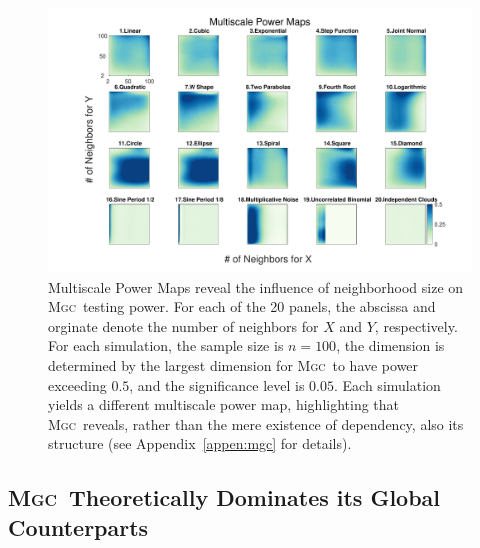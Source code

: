 \documentclass[11pt]{article}
\providecommand{\sct}[1]{{\normalfont\textsc{#1}}}
\newcommand{\Mgc}{\sct{Mgc}}
\begin{document}
\begin{figure}[htbp]
\includegraphics[width=1.0\textwidth]{../Figures/FigHDHeat}
\caption{Multiscale Power Maps reveal the influence of neighborhood size on \Mgc~testing power.
For each of the 20 panels, the abscissa and orginate denote the number of neighbors for $X$ and  $Y$, respectively. For each simulation, the sample size is $n=100$,  the dimension is determined by the largest dimension for \Mgc~to have power exceeding $0.5$, and the significance level is $0.05$. Each simulation yields a different multiscale power map, highlighting that \Mgc~reveals, rather than the mere existence of dependency, also its  structure  (see Appendix~\ref{appen:mgc} for details).}
\label{f:powermaps}
\end{figure}


\subsection*{\Mgc~Theoretically Dominates its Global Counterparts}
\label{s:theory}
\end{document}
